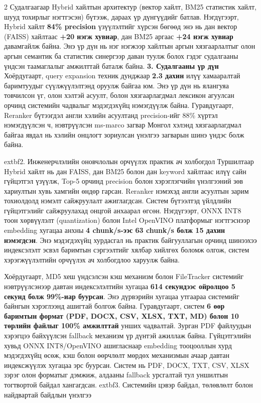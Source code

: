 \documentclass[11pt,a4paper]{article}
\begin{document}
\begin{multicols*}{2}
Судалгаагаар Hybrid хайлтын архитектур (вектор хайлт, BM25 статистик хайлт, шууд тохирлыг нэгтгэсэн) бүтээж, дараах үр дүнгүүдийг батлав. Нэгдүгээрт, Hybrid хайлт \textbf{84\% precision} үзүүлэлтийг хүрсэн бөгөөд энэ нь дан вектор (FAISS) хайлтаас \textbf{+20 нэгж хувиар}, дан BM25 аргаас \textbf{+24 нэгж хувиар} давамгайлж байна. Энэ үр дүн нь нэг нэгжээр хайлтын аргын хязгаарлалтыг олон аргын семантик ба статистик синергээр даван туулж болох гэдэг судалгааны үндсэн таамаглалыг амжилттай баталж байна.
\noindent\textbf{3. Судалгааны үр дүн}
Хоёрдугаарт, query expansion техник дунджаар \textbf{2.3 дахин} илүү хамааралтай баримтуудыг сүүлжүүлэлтэнд оруулж байгаа юм. Энэ үр дүн нь ялангуяа товчилсон үг, олон хэлтэй асуулт, болон хязгаарлагдмал лексикон агуулсан орчинд системийн чадвалыг мэдэгдэхүйц нэмэгдүүлж байна. Гуравдугаарт, Reranker бүтээгдэл англи хэлийн асуултанд precision-ийг 88\% хүртэл нэмэгдүүлсэн ч, нэвтрүүлсэн ms-marco загвар Монгол хэлэнд хязгаарлагдмал байгаа явдал нь хэлийн онцлогт зориулсан үнэлгээ загварын шинэ үндэс болж байна.

      extbf{2. Инженерчлэлийн оновчлолын орчүүлэх практик ач холбогдол}
Туршилтаар Hybrid хайлт нь дан FAISS, дан BM25 болон дан keyword хайлтаас илүү сайн гүйцэтгэл үзүүлж, Top-5 орчинд precision болон хэрэглэгчийн үнэлгээний зөв хариултын хувь хамгийн өндөр гарсан. Reranker нэмэхэд англи асуултын зарим тохиолдолд нэмэлт сайжруулалт ажиглагдсан.
Систем бүтээлтэд үйлдлийн гүйцэтгэлийг сайжруулахад онцгой анхаарал өгсөн. Нэгдүгээрт, ONNX INT8 тоон хөрвүүлэлт (quantization) болон Intel OpenVINO платформыг нэгтгэснээр embedding хугацаа анхны \textbf{4 chunk/s-ээс 63 chunk/s болж 15 дахин нэмэгдсэн}. Энэ мэдэгдэхүйц хурдасгал нь практик байгууллагын орчинд шинээхээ индексэлэлт эсвэл баримтын сэргээлтийг хялбар хийлгөх боломж олгож, систем хэрэгжүүлэлтийн орчүүлэх ач холбогдлоо харуулж байна.

Хоёрдугаарт, MD5 хеш үндсэлсэн кэш механизм болон FileTracker системийг нэвтрүүлсэнээр давтан индексэлэлтийн хугацаа \textbf{614 секундээс ойролцоо 5 секунд болж 99\%-иар буурсан}. Энэ дүрвэрийн хугацаа утгаараа системийг байнгын хэрэглээнд ашигтай болгож байна. Гуравдугаарт, систем \textbf{6 өөр баримтын формат (PDF, DOCX, CSV, XLSX, TXT, MD) болон 10 төрлийн файлыг 100\% амжилттай} унших чадвалтай. Зурган PDF файлуудын хэрэгцээ байхүүлсэн fallback механизм үр дүнтэй ажиллаж байна.
Гүйцэтгэлийн хувьд ONNX INT8/OpenVINO ашигласнаар embedding тооцооллын хурд мэдэгдэхүйц өсөж, кэш болон өөрчлөлт мөрдөх механизмын ачаар давтан индексжүүлэх хугацаа эрс буурсан. Систем нь PDF, DOCX, TXT, CSV, XLSX зэрэг олон форматыг дэмжиж, алдааны fallback урсгалтай тул уншилтын тогтвортой байдал хангагдсан.
      extbf{3. Системийн цэвэр байдал, төлөвлөлт болон найдвартай байдлын үнэлгээ}


\end{multicols*}
\end{document}
